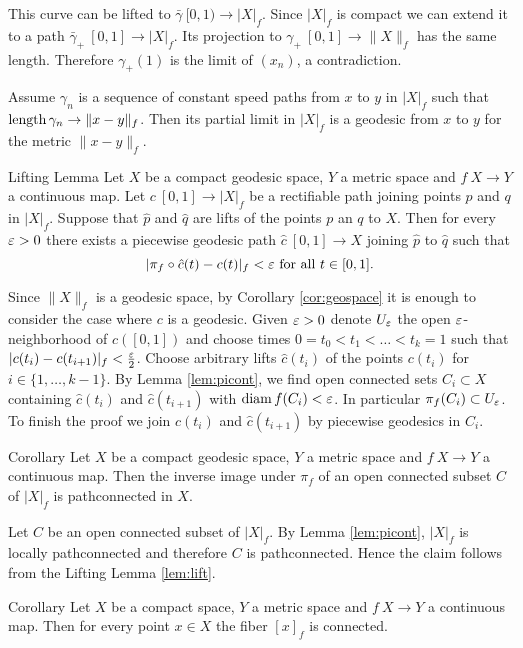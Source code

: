 \documentclass{article}
\begin{document}
This curve can be lifted to $\bar\gamma\:[0,1)\to |X|_f$.
Since $|X|_f$ is compact we can extend it to a path $\bar\gamma_+\:[0,1]\to |X|_f$.
Its projection to  $\gamma_+\:[0,1]\to\|X\|_f$ has the same length.
Therefore $\gamma_+(1)$ is the limit of $(x_n)$, a contradiction.

Assume $\gamma_n$ is a sequence of constant speed paths from $x$ to $y$ in $|X|_f$
such that $\mathop{\rm length}\nolimits\gamma_n\to \|x-y\|_f$.
Then its partial limit in $|X|_f$ is a geodesic from $x$ to $y$ for the metric $\|x-y\|_f$.
\qeds

\begin{thm}{Lifting Lemma}\label{lem:lift}
Let $X$ be a compact geodesic space, $Y$ a metric space and $f\:X\to Y$ a continuous map. 
Let $c\:[0,1]\to|X|_f$ be a rectifiable path joining points $p$ and $q$ in $|X|_f$. 
Suppose that $\hat p$ and $\hat q$ are lifts of the points $p$ an $q$ to $X$.
Then for every $\varepsilon>0$ there exists a piecewise geodesic path $\hat c\:[0,1]\to X$ joining $\hat p$ to $\hat q$ such that 
\[|\pi_f\circ\hat c(t)-c(t)|_f<\varepsilon\ \text{for all}\ t\in[0,1].\]
\end{thm}

Since $\|X\|_f$ is a geodesic space, 
by Corollary \ref{cor:geospace} it is enough to consider the case where $c$ is a geodesic.
Given $\varepsilon>0$ denote $U_\varepsilon$ the open $\varepsilon$-neighborhood of $c([0,1])$ and choose times $0=t_0<t_1<\ldots<t_k=1$ 
such that $|c(t_i)-c(t_{i+1})|_f<\frac{\varepsilon}{2}$. 
Choose arbitrary lifts $\hat c(t_i)$ of the points $c(t_i)$ for $i\in\{1,\ldots,k-1\}$.
By Lemma \ref{lem:picont}, we find open connected sets $C_i\subset X$ containing $\hat c(t_i)$ and $\hat c(t_{i+1})$ with $\mathop{\rm diam}\nolimits f(C_i)<\varepsilon$. 
In particular $\pi_f(C_i)\subset U_\varepsilon$. 
To finish the proof we join $\hat c(t_i)$ and $\hat c(t_{i+1})$ by piecewise geodesics in $C_i$.
\qeds

\begin{thm}{Corollary}\label{cor:connecedpreimage}
Let $X$ be a compact geodesic space, $Y$ a metric space and $f\:X\to Y$ a continuous map. 
Then the inverse image under $\pi_f$ of an open connected subset $C$ of $|X|_f$  is pathconnected in $X$.
\end{thm}

Let $C$ be an open connected subset of $|X|_f$. 
By Lemma \ref{lem:picont}, $|X|_f$ is locally pathconnected and therefore
$C$ is pathconnected. 
Hence the claim follows from the Lifting Lemma \ref{lem:lift}.
\qeds


\begin{thm}{Corollary}\label{cor:fiberconnected}
Let $X$ be a compact space, 
$Y$ a metric space and $f\:X\to Y$ a continuous map.
Then for every point $x\in X$ the fiber $[x]_f$ is connected.
\end{thm}
\end{document}

